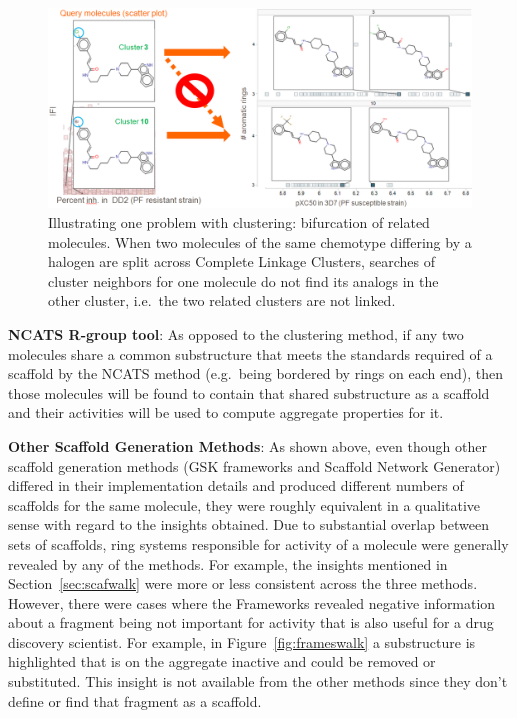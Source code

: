 \documentclass[journal=jacsat,manuscript=article]{achemso}
\newcommand*\fref[1]{Figure~\ref{fig:#1}}
\newcommand*\sref[1]{Section~\ref{sec:#1}}
\newcommand*\eg{e.g.~}
\newcommand*\ie{i.e.~}
\begin{document}
\begin{figure}
\includegraphics[width=6in]{fig/clusterlanes.png}
\caption{Illustrating one problem with clustering: bifurcation of related molecules.  When two molecules of the same chemotype differing by a halogen are split across Complete Linkage Clusters, searches of cluster neighbors for one molecule do not find its analogs in the other cluster, \ie the two related clusters are not linked.}
\label{fig:clusterlanes}
\end{figure}



{\bf NCATS R-group tool}: As opposed to the clustering method, 
if any two molecules share a common substructure that meets the standards required of a scaffold by the NCATS method (\eg being bordered by rings on each end), then those molecules will be found to contain that shared substructure as a scaffold and their activities will be used to compute aggregate properties for it. 

{\bf Other Scaffold Generation Methods}: As shown above, even though other scaffold generation methods (GSK frameworks and Scaffold Network Generator) differed in their implementation details and produced different numbers of scaffolds for the same molecule, they were roughly equivalent in a qualitative sense with regard to the insights obtained. Due to substantial overlap between sets of scaffolds, ring systems responsible for activity of a molecule were generally revealed by any of the methods. For example, the insights mentioned in \sref{scafwalk} were more or less consistent across the three methods. However, there were cases where the Frameworks revealed negative information about a fragment being not important for activity that is also useful for a drug discovery scientist. For example, in \fref{frameswalk} a substructure is highlighted that is on the aggregate inactive and could be removed or substituted. This insight is not available from the other methods since they don't define or find that fragment as a scaffold.
\end{document}
